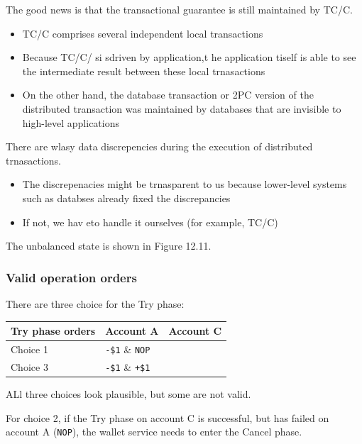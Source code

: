 \documentclass{report}
\theoremstyle{definition}
\let\oldsubsubsection\subsubsection
\renewcommand{\subsubsection}{\oldsubsubsection*}
\begin{document}
The good news is that the transactional guarantee is still maintained by TC/C.

\begin{itemize}
\item
TC/C comprises several independent local transactions
\item
Because TC/C/ si sdriven by application,t he application tiself is able to see the intermediate result between these local trnasactions
\item
On the other hand, the database transaction or 2PC version of the distributed transaction was maintained by databases that are invisible to high-level applications
\end{itemize}

There are wlasy data discrepencies during the execution of distributed trnasactions.

\begin{itemize}
\item
The discrepenacies might be trnasparent to us because lower-level systems such as databses already fixed the discrepancies
\item
If not, we hav eto handle it ourselves (for example, TC/C)
\end{itemize}

The unbalanced state is shown in Figure 12.11.

\subsubsection{Valid operation orders}

There are three choice for the Try phase:

\begin{tabular}{|p{4cm}|p{4cm}|p{4cm}|}
\hline
Try phase orders & Account A & Account C \\
\hline
Choice 1 & \lstinline|-$1| & \lstinline|NOP| \\
\hline
Choice 2 & \lstinline|NOP| & \lstinline|+$1| \\
\hline
Choice 3 & \lstinline|-$1| & \lstinline|+$1| \\
\hline
\end{tabular}

ALl three choices look plausible, but some are not valid.

For choice 2, if the Try phase on account C is successful, but has failed on account A (\lstinline|NOP|), the wallet service needs to enter the Cancel phase.
\end{document}

